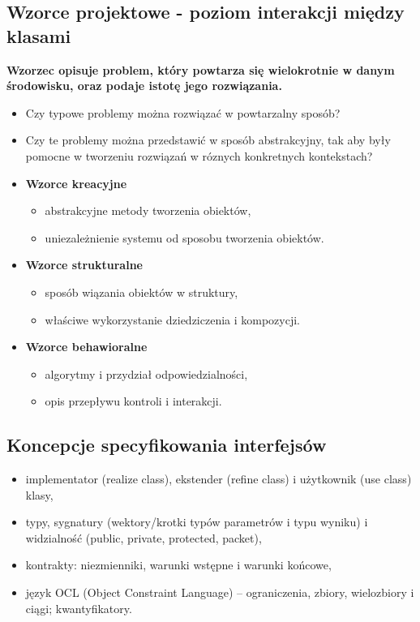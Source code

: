 \documentclass[../main.tex]{subfiles}
\begin{document}
    \subsection{Wzorce projektowe - poziom interakcji między klasami}
    \textbf{Wzorzec opisuje problem, który powtarza się wielokrotnie w danym środowisku, oraz podaje istotę
    jego rozwiązania.}

    \begin{itemize}
        \item Czy typowe problemy można rozwiązać w powtarzalny sposób?
        \item Czy te problemy można przedstawić w sposób abstrakcyjny, tak aby były pomocne
        w tworzeniu rozwiązań w róznych konkretnych kontekstach?
    \end{itemize}

    \begin{itemize}
        \item \textbf{Wzorce kreacyjne}
        \begin{itemize}
            \item abstrakcyjne metody tworzenia obiektów,
            \item uniezależnienie systemu od sposobu tworzenia obiektów.
        \end{itemize}
        \item \textbf{Wzorce strukturalne}
        \begin{itemize}
            \item sposób wiązania obiektów w struktury,
            \item właściwe wykorzystanie dziedziczenia i kompozycji.
        \end{itemize}
        \item \textbf{Wzorce behawioralne}
        \begin{itemize}
            \item algorytmy i przydział odpowiedzialności,
            \item opis przepływu kontroli i interakcji.
        \end{itemize}
    \end{itemize}

    \subsection{Koncepcje specyfikowania interfejsów}
    \begin{itemize}
        \item implementator (realize class), ekstender (refine class) i użytkownik (use class) klasy,
        \item typy, sygnatury (wektory/krotki typów parametrów i typu wyniku) i widzialność (public, private, protected, packet),
        \item kontrakty: niezmienniki, warunki wstępne i warunki końcowe,
        \item język OCL (Object Constraint Language) – ograniczenia, zbiory, wielozbiory i ciągi; kwantyfikatory.
    \end{itemize}
\end{document}
